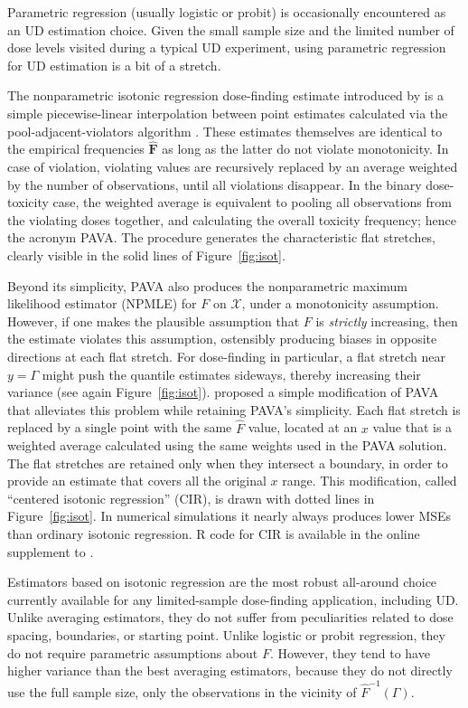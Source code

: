 Parametric regression (usually logistic or probit) is occasionally encountered as an UD estimation choice. Given the small sample size and the limited number of dose levels visited during a typical UD experiment, using parametric regression for UD estimation is a bit of a stretch.

The nonparametric isotonic regression dose-finding estimate introduced by \citep{Styl:Flou:dose:2002} is a simple piecewise-linear interpolation between point estimates calculated via the pool-adjacent-violators algorithm \citep[PAVA,][]{BBBB:order:1972}. These estimates themselves are identical to the empirical frequencies $\mathbf{\hat{F}}$ as long as the latter do not violate monotonicity. In case of violation, violating values are recursively replaced by an average weighted by the number of observations, until all violations disappear. In the binary dose-toxicity case, the weighted average is equivalent to pooling all observations from the violating doses together, and calculating the overall toxicity frequency; hence the acronym PAVA. The procedure generates the characteristic flat stretches, clearly visible in the solid lines of Figure~\ref{fig:isot}.

Beyond its simplicity, PAVA also produces the nonparametric maximum likelihood estimator (NPMLE) for $F$ on $\mathcal{X}$, under a monotonicity assumption. However, if one makes the plausible assumption that $F$ is \emph{strictly} increasing, then the estimate violates this assumption, ostensibly producing biases in opposite directions at each flat stretch. For dose-finding in particular, a flat stretch near $y=\Gamma$ might push the quantile estimates sideways, thereby increasing their variance (see again Figure~\ref{fig:isot}). \cite[Section~3.3]{Oron07} proposed a simple modification of PAVA that alleviates this problem while retaining PAVA's simplicity. Each flat stretch is replaced by a single point with the same $\hat{F}$ value, located at an $x$ value that is a weighted average calculated using the same weights used in the PAVA solution. The flat stretches are retained only when they intersect a boundary, in order to provide an estimate that covers all the original $x$ range. This modification, called ``centered isotonic regression'' (CIR), is drawn with dotted lines in Figure~\ref{fig:isot}. In numerical simulations it nearly always produces lower MSEs than ordinary isotonic regression. R code for CIR is available in the online supplement to \cite{Oron:Hoff:smal:2013}.

Estimators based on isotonic regression are the most robust all-around choice currently available for any limited-sample dose-finding application, including UD. Unlike averaging estimators, they do not suffer from peculiarities related to dose spacing, boundaries, or starting point. Unlike logistic or probit regression, they do not require parametric assumptions about $F$. However, they tend to have higher variance than the best averaging estimators, because they do not directly use the full sample size, only the observations in the vicinity of $\hat{F}^{-1}(\Gamma)$.

